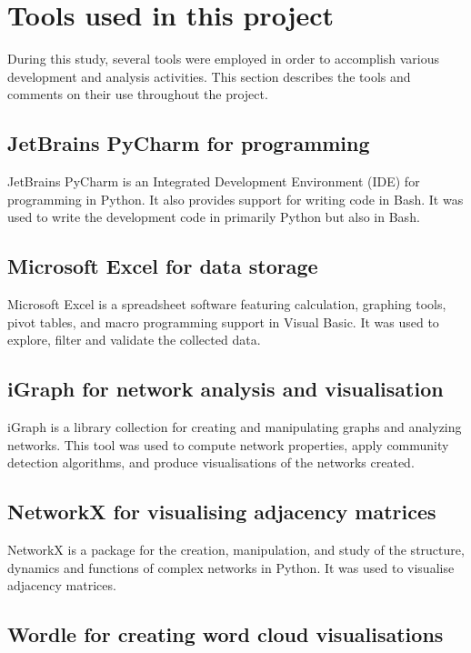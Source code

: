 \section{Tools used in this project}

During this study, several tools were employed in order to accomplish various development and analysis activities. This section describes the tools and comments on their use throughout the project.

\subsection{JetBrains PyCharm for programming}

JetBrains PyCharm \cite{jetbrains_pycharm} is an Integrated Development Environment (IDE) for programming in Python. It also provides support for writing code in Bash. It was used to write the development code in primarily Python but also in Bash.

\subsection{Microsoft Excel for data storage}

Microsoft Excel \cite{microsoft_excel} is a spreadsheet software featuring calculation, graphing tools, pivot tables, and macro programming support in Visual Basic. It was used to explore, filter and validate the collected data.

\subsection{iGraph for network analysis and visualisation}

iGraph \cite{csardi2006igraph} is a library collection for creating and manipulating graphs and analyzing networks. This tool was used to compute network properties, apply community detection algorithms, and produce visualisations of the networks created.

\subsection{NetworkX for visualising adjacency matrices}

NetworkX \cite{networkx} is a package for the creation, manipulation, and study of the structure, dynamics and functions of complex networks in Python. It was used to visualise adjacency matrices.

\subsection{Wordle for creating word cloud visualisations}

